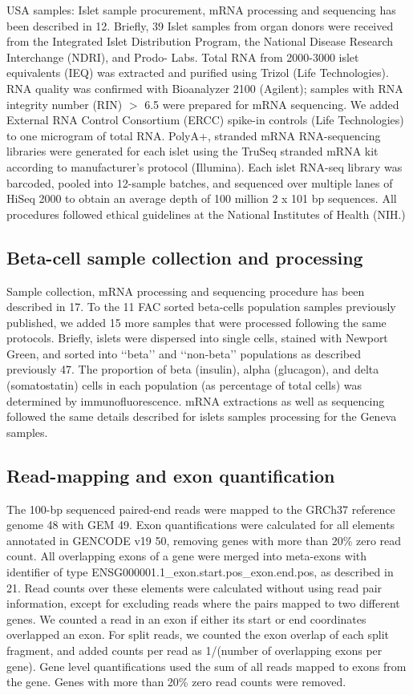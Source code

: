 USA samples: Islet sample procurement, mRNA processing and sequencing has been described in 12. Briefly, 39 Islet samples from organ donors were received from the Integrated Islet Distribution Program, the National Disease Research Interchange (NDRI), and Prodo- Labs. Total RNA from 2000-3000 islet equivalents (IEQ) was extracted and purified using Trizol (Life Technologies). RNA quality was confirmed with Bioanalyzer 2100 (Agilent); samples with RNA integrity number (RIN) $>$ 6.5 were prepared for mRNA sequencing. We added External RNA Control Consortium (ERCC) spike-in controls (Life Technologies) to one microgram of total RNA. PolyA+, stranded mRNA RNA-sequencing libraries were generated for each islet using the TruSeq stranded mRNA kit according to manufacturer’s protocol (Illumina). Each islet RNA-seq library was barcoded, pooled into 12-sample batches, and sequenced over multiple lanes of HiSeq 2000 to obtain an average depth of 100 million 2 x 101 bp sequences. All procedures followed ethical guidelines at the National Institutes of Health (NIH.)

\subsection{Beta-cell sample collection and processing}
Sample collection, mRNA processing and sequencing procedure has been described in 17. To the 11 FAC sorted beta-cells population samples previously published, we added 15 more samples that were processed following the same protocols. Briefly, islets were dispersed into single cells, stained with Newport Green, and sorted into ‘‘beta’’ and ‘‘non-beta’’ populations as described previously 47. The proportion of beta (insulin), alpha (glucagon), and delta (somatostatin) cells in each population (as percentage of total cells) was determined by immunofluorescence. mRNA extractions as well as sequencing followed the same details described for islets samples processing for the Geneva samples.

\subsection{Read-mapping and exon quantification}
The 100-bp sequenced paired-end reads were mapped to the GRCh37 reference genome 48 with GEM 49. Exon quantifications were calculated for all elements annotated in GENCODE v19 50, removing genes with more than 20\% zero read count. All overlapping exons of a gene were merged into meta-exons with identifier of type ENSG000001.1_exon.start.pos_exon.end.pos, as described in 21. Read counts over these elements were calculated without using read pair information, except for excluding reads where the pairs mapped to two different genes. We counted a read in an exon if either its start or end coordinates overlapped an exon. For split reads, we counted the exon overlap of each split fragment, and added counts per read as 1/(number of overlapping exons per gene). Gene level quantifications used the sum of all reads mapped to exons from the gene. Genes with more than 20\% zero read counts were removed.  	

